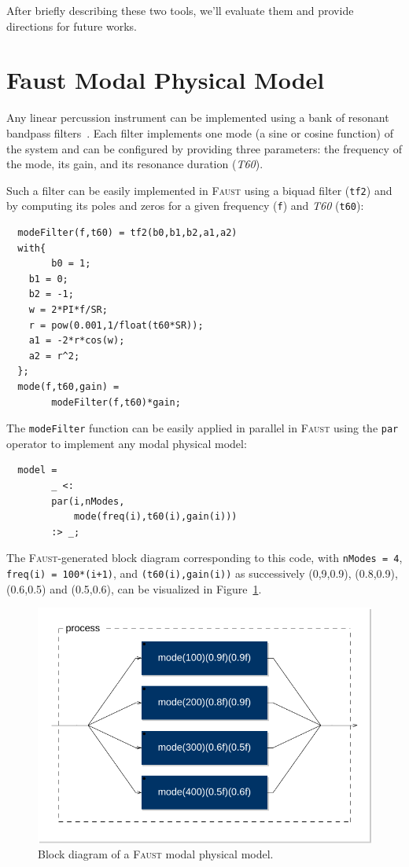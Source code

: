 \documentclass[11pt,a4paper]{article}
\newcommand{\f}{\textsc{Faust}}
\begin{document}
After briefly describing these two tools, we'll evaluate them and provide directions for future works.

\section{Faust Modal Physical Model}
\label{sec:model}

Any linear percussion instrument can be implemented using a bank of resonant bandpass filters~\cite{Smith2010}. Each filter implements one mode (a sine or cosine function) of the system and can be configured by providing three parameters: the frequency of the mode, its gain, and its resonance duration (\textit{T60}).

Such a filter can be easily implemented in \f{} using a biquad filter (\texttt{tf2}) and by computing its poles and zeros for a given frequency (\texttt{f}) and \textit{T60} (\texttt{t60}):

\begin{lstlisting}
  modeFilter(f,t60) = tf2(b0,b1,b2,a1,a2)
  with{
        b0 = 1;
	b1 = 0;
	b2 = -1;
	w = 2*PI*f/SR;
	r = pow(0.001,1/float(t60*SR));
	a1 = -2*r*cos(w);
	a2 = r^2;
  };
  mode(f,t60,gain) = 
        modeFilter(f,t60)*gain;
\end{lstlisting}

The \texttt{modeFilter} function can be easily applied in parallel in \f{} using the \texttt{par} operator to implement any modal physical model:

\begin{lstlisting}
  model = 
        _ <: 
        par(i,nModes,
            mode(freq(i),t60(i),gain(i)))
        :> _;
\end{lstlisting}

The \f{}-generated block diagram corresponding to this code, with \lstinline{nModes = 4}, \lstinline{freq(i) = 100*(i+1)}, and \lstinline{(t60(i),gain(i))} as successively (0,9,0.9), (0.8,0.9), (0.6,0.5) and (0.5,0.6), can be visualized in Figure~\ref{fig:modalModel}.

\begin{figure}[htbp]
 	\centering \includegraphics[width=\columnwidth]{pictures/modalModel}
	\caption{Block diagram of a \f{} modal physical model.}
	\label{fig:modalModel}
\end{figure}
\end{document}
